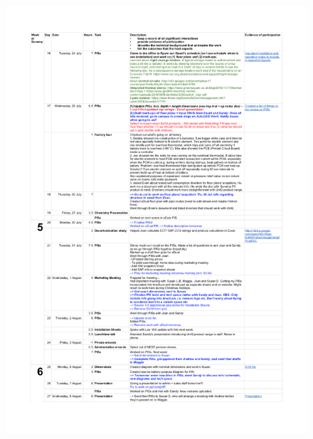 \begin{figure}
	\centering
	\includegraphics[height=\textheight]{Appendices/Log_03.png}
\end{figure}


